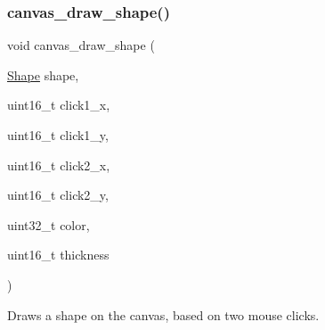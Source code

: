 \subsubsection{\texorpdfstring{canvas\+\_\+draw\+\_\+shape()}{canvas\_draw\_shape()}}
{\footnotesize\ttfamily void canvas\+\_\+draw\+\_\+shape (\begin{DoxyParamCaption}\item[{\mbox{\hyperlink{group__canvas_ga55b506070847a13554f8b879c1bfb37c}{Shape}}}]{shape,  }\item[{uint16\+\_\+t}]{click1\+\_\+x,  }\item[{uint16\+\_\+t}]{click1\+\_\+y,  }\item[{uint16\+\_\+t}]{click2\+\_\+x,  }\item[{uint16\+\_\+t}]{click2\+\_\+y,  }\item[{uint32\+\_\+t}]{color,  }\item[{uint16\+\_\+t}]{thickness }\end{DoxyParamCaption})}



Draws a shape on the canvas, based on two mouse clicks. 



